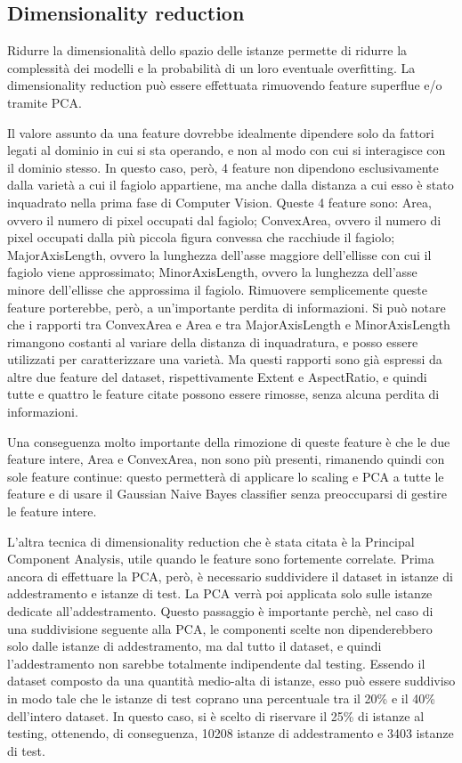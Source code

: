 \subsection{Dimensionality reduction}
Ridurre la dimensionalità dello spazio delle istanze permette di ridurre la
complessità dei modelli e la probabilità di un loro eventuale overfitting.
La dimensionality reduction può essere effettuata rimuovendo feature superflue
e/o tramite PCA.

Il valore assunto da una feature dovrebbe idealmente dipendere solo
da fattori legati al dominio in cui si sta operando, e non al modo con cui 
si interagisce con il dominio stesso. 
In questo caso, però, 4 feature non dipendono esclusivamente dalla varietà a cui
il fagiolo appartiene, ma anche dalla distanza a cui esso è stato
inquadrato nella prima fase di Computer Vision. Queste 4 feature sono: 
Area, ovvero il numero di pixel occupati dal fagiolo; ConvexArea, ovvero il
numero di pixel occupati dalla più piccola figura convessa che racchiude
il fagiolo; MajorAxisLength, ovvero la lunghezza dell'asse maggiore dell'ellisse
con cui il fagiolo viene approssimato; MinorAxisLength, ovvero la lunghezza
dell'asse minore dell'ellisse che approssima il fagiolo.
Rimuovere semplicemente queste feature porterebbe, però, a un'importante perdita
di informazioni. Si può notare che i rapporti tra ConvexArea e Area
e tra MajorAxisLength e MinorAxisLength rimangono costanti al variare della
distanza di inquadratura, e posso essere utilizzati per caratterizzare una
varietà.
Ma questi rapporti sono già espressi da altre due feature del dataset,
rispettivamente Extent e AspectRatio, e quindi tutte e quattro le feature
citate possono essere rimosse, senza alcuna perdita di informazioni.

Una conseguenza molto importante della rimozione di queste feature è che le
due feature intere, Area e ConvexArea, non sono più presenti, rimanendo quindi con sole
feature continue: questo permetterà di applicare lo scaling e PCA a tutte le
feature e di usare il Gaussian Naive Bayes classifier senza preoccuparsi di
gestire le feature intere.

L'altra tecnica di dimensionality reduction che è stata citata è
la Principal Component Analysis, utile quando le feature sono fortemente correlate.
Prima ancora di effettuare la PCA, però, è necessario suddividere il dataset
in istanze di addestramento e istanze di test. La PCA verrà poi applicata
solo sulle istanze dedicate all'addestramento. Questo passaggio è importante
perchè, nel caso di una suddivisione seguente alla PCA, le componenti scelte
non dipenderebbero solo dalle istanze di addestramento, ma dal tutto il dataset,
e quindi l'addestramento non sarebbe totalmente indipendente dal testing.
Essendo il dataset composto da una quantità medio-alta di istanze,
esso può essere suddiviso in
modo tale che le istanze di test coprano una percentuale tra il 20\% e 
il 40\% dell'intero dataset.
In questo caso, si è scelto di riservare il 25\% di istanze al testing,
ottenendo, di conseguenza, 10208 istanze di addestramento e 3403 istanze di test.

